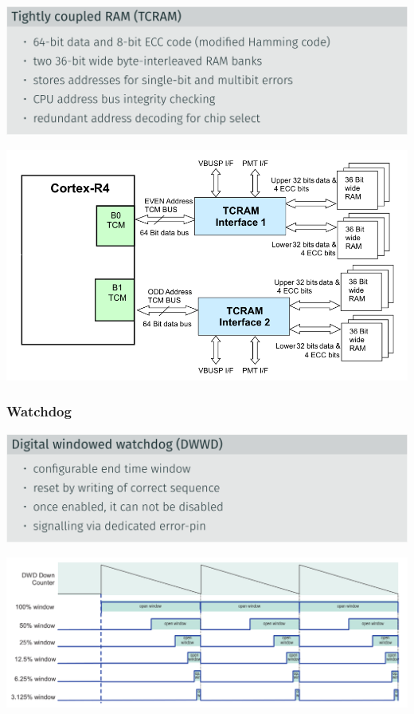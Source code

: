\documentclass[
  10pt,
  a4paper,
]{article}
\begin{document}
\begin{multicols*}{2}
\includegraphics{images/safety/image-25.png}

\includegraphics{images/safety/image-24.png}

\subsubsection{Watchdog}\label{watchdog}

\includegraphics{images/safety/image-27.png}

\includegraphics{images/safety/image-28.png}


\end{multicols*}
\end{document}
